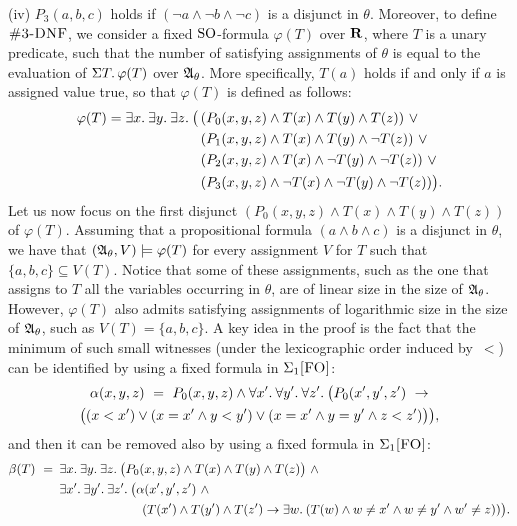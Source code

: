 (iv) $P_3(a,b,c)$ holds if $(\neg a \wedge \neg b \wedge \neg c)$ is a disjunct in $\theta$.
Moreover, to define $\ctdnf$, we consider a fixed ${\rm SO}$-formula $\varphi(T)$ over $\mathbf{R}$, where $T$ is a unary predicate, such that the number of satisfying assignments of $\theta$ is equal to the evaluation of $\Sigma{T}.\,\varphi(T)$ over $\mathfrak{A}_\theta$. More specifically, $T(a)$ holds if and only if  $a$ is assigned value true, so that $\varphi(T)$ is defined as follows:
\begin{align*}
\varphi(T) = \exists{x}.\:\exists{y}.\:\exists{z}.\:\big(\,
&(P_0(x,y,z)\wedge T(x)\wedge  T(y)\wedge T(z))\ \vee\\
&(P_1(x,y,z)\wedge T(x)\wedge  T(y)\wedge \neg T(z))\ \vee\\
&(P_2(x,y,z)\wedge T(x)\wedge \neg T(y)\wedge \neg T(z))\ \vee\\
&(P_3(x,y,z)\wedge \neg T(x)\wedge \neg T(y)\wedge \neg T(z))\big).
\end{align*}
Let us now focus on the first disjunct $(P_0(x,y,z)\wedge T(x)\wedge  T(y)\wedge T(z))$ of $\varphi(T)$. Assuming that a propositional formula $(a\wedge b \wedge c)$ is a disjunct in $\theta$, we have that $(\mathfrak{A}_\theta,V) \models \varphi(T)$ for every assignment $V$ for $T$ such that $\{a,b,c\} \subseteq V(T)$. 
Notice that some of these assignments, such as the one that assigns to $T$ all the variables occurring in $\theta$, are of linear size in the size of $\mathfrak{A}_\theta$. However, $\varphi(T)$ also admits satisfying assignments of logarithmic size in the size of $\mathfrak{A}_\theta$, such as $V(T) = \{a,b,c\}$. A key idea in the proof is the fact that the minimum of such small witnesses (under the lexicographic order induced by~$<$) can be identified by using a fixed formula in $\Sigma_{1}\textsc{[FO]}$:
\begin{multline*}
\alpha(x,y,z) \ = \ P_0(x,y,z) \wedge  \forall{x'}.\:\forall{y'}.\:\forall{z'}.\: \big(P_0(x',y',z')\ \to\\
\big((x < x') \vee (x = x' \wedge y < y') \vee (x = x' \wedge y = y' \wedge z < z')\big)\big),
\end{multline*}
and then it can be removed also by using a fixed formula in $\Sigma_{1}\textsc{[FO]}$:
\begin{align*}
\beta(T) \ = \ \, & \ex{x} \ex{y} \ex{z} \big(P_0(x,y,z)\wedge T(x)\wedge  T(y)\wedge T(z)\big)\ \wedge \\
& \ex{x'}\ex{y'}\ex{z'} \big(\alpha(x',y',z')\ \wedge \\
& \hspace{23mm} (T(x')\wedge T(y')\wedge T(z')\to \ex{w}(T(w) \wedge w \neq x' \wedge w\neq y' \wedge w'\neq z))\big).
\end{align*}
